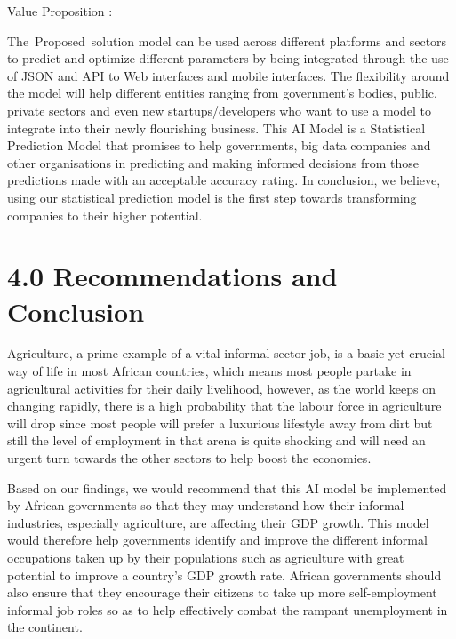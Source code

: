 \documentclass[12pt]{article}
\renewcommand{\_}{\kern-1.5pt\textunderscore\kern-1.5pt}
\begin{document}
\vspace{\baselineskip}
\begin{justify}
{\fontsize{9pt}{10.8pt} Value Proposition : }
\end{justify}

\vspace{\baselineskip}
\begin{justify}
{\fontsize{9pt}{10.8pt}\selectfont The\ Proposed\ solution model can be used across different platforms and sectors to predict and optimize different parameters by being integrated through the use of JSON and API to  Web interfaces and mobile interfaces. The flexibility around the model will help different entities ranging from government’s bodies, public,  private sectors and even new startups/developers who want to use a model to integrate into their newly flourishing business. This AI Model is a Statistical Prediction Model that promises to help governments, big data companies and other organisations in predicting and making informed decisions from those predictions made with an acceptable accuracy rating. In conclusion, we believe, using our statistical prediction model is the first step towards transforming companies to their higher potential. \par}
\end{justify}
\section*{4.0 Recommendations and Conclusion}
\begin{justify}
{\fontsize{9pt}{10.8pt}\selectfont Agriculture, a prime example of a vital informal sector job, is a basic yet crucial way of life in most African countries, which means most people partake in agricultural activities for their daily livelihood, however, as the world keeps on changing rapidly, there is a high probability that the labour force in agriculture will drop since most people will prefer a luxurious lifestyle away from dirt but still the level of employment in that arena is quite shocking and will need an urgent turn towards the other sectors to help boost the economies.\par}
\end{justify}

\vspace{\baselineskip}
\begin{justify}
{\fontsize{9pt}{10.8pt}\selectfont Based on our findings, we would recommend that this AI model be implemented by African governments so that they may understand how their informal industries, especially agriculture, are affecting their GDP growth. This model would therefore help governments identify and improve the different informal occupations taken up by their populations such as agriculture with great potential to improve a country’s GDP growth rate. African governments should also ensure that they encourage their citizens to take up more self-employment informal job roles so as to help effectively combat the rampant unemployment in the continent.\par}
\end{justify}
\end{document}
